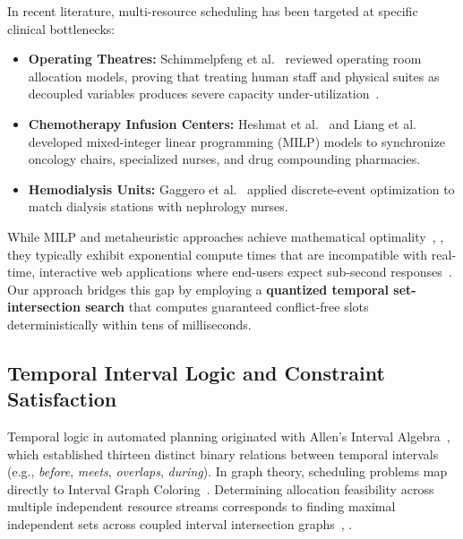 \documentclass[conference]{IEEEtran}
\begin{document}
In recent literature, multi-resource scheduling has been targeted at specific clinical bottlenecks:
\begin{itemize}
    \item \textbf{Operating Theatres:} Schimmelpfeng et al.~\cite{schimmelpfeng2021operating} reviewed operating room allocation models, proving that treating human staff and physical suites as decoupled variables produces severe capacity under-utilization~\cite{samudra2016scheduling}.
    \item \textbf{Chemotherapy Infusion Centers:} Heshmat et al.~\cite{heshmat2018two} and Liang et al.~\cite{liang2021robust} developed mixed-integer linear programming (MILP) models to synchronize oncology chairs, specialized nurses, and drug compounding pharmacies.
    \item \textbf{Hemodialysis Units:} Gaggero et al.~\cite{gaggero2021decision} applied discrete-event optimization to match dialysis stations with nephrology nurses.
\end{itemize}

While MILP and metaheuristic approaches achieve mathematical optimality~\cite{heshmat2018two}, \cite{liang2021robust}, they typically exhibit exponential compute times that are incompatible with real-time, interactive web applications where end-users expect sub-second responses~\cite{fielding2000architectural}. Our approach bridges this gap by employing a \textbf{quantized temporal set-intersection search} that computes guaranteed conflict-free slots deterministically within tens of milliseconds.

\subsection{Temporal Interval Logic and Constraint Satisfaction}
Temporal logic in automated planning originated with Allen's Interval Algebra~\cite{allen1983maintaining}, which established thirteen distinct binary relations between temporal intervals (e.g., \textit{before}, \textit{meets}, \textit{overlaps}, \textit{during}). In graph theory, scheduling problems map directly to Interval Graph Coloring~\cite{golumbic2004algorithmic}. Determining allocation feasibility across multiple independent resource streams corresponds to finding maximal independent sets across coupled interval intersection graphs~\cite{allen1983maintaining}, \cite{golumbic2004algorithmic}.
\end{document}

